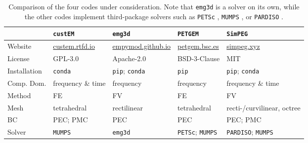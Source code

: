 \documentclass[onecolumn,extra,camera]{gji}
\newcommand{\emg}[2]{\texttt{emg#1#2}\xspace}
\newcommand{\simpeg}{\texttt{SimPEG}\xspace}
\newcommand{\custem}{\texttt{custEM}\xspace}
\newcommand{\petgem}{\texttt{PETGEM}\xspace}
\begin{document}
%
\begin{table}
\begin{minipage}{.9\linewidth}
  \centering
  \caption{Comparison of the four codes under consideration. Note that \emg3d is a solver on its own, while the other codes implement third-package solvers such as \texttt{PETSc} \citep{Preprint.Abhyankar}, \texttt{MUMPS} \citep{SIAM.01.Amestoy}, or \texttt{PARDISO} \citep{FGCS.04.Schenk}.}
\label{tbl:codecomparison}
  \begin{tabularx}{\linewidth}{lXXXX}
  \toprule
  & \custem & \emg3d & \petgem & \simpeg  \\
  \midrule
  Website & \href{https://custem.rtfd.io}{custem.rtfd.io}
          & \href{https://empymod.github.io}{empymod.github.io}
          & \href{http://petgem.bsc.es}{petgem.bsc.es}
          & \href{https://docs.simpeg.xyz}{simpeg.xyz} \\
  License & GPL-3.0 & Apache-2.0 & BSD-3-Clause & MIT \\
  Installation & \texttt{conda}
               & \texttt{pip}; \texttt{conda}
               & \texttt{pip}
               & \texttt{pip}; \texttt{conda} \\
  Comp. Dom. & frequency \& time & frequency & frequency & frequency \& time \\
  Method & FE & FV & FE & FV \\
  Mesh & tetrahedral & rectilinear & tetrahedral & recti-/curvilinear, octree \\
  BC & PEC; PMC & PEC & PEC & PEC; PMC \\
  Solver & \texttt{MUMPS} & \emg3d & \texttt{PETSc}; \texttt{MUMPS} &
           \texttt{PARDISO}; \texttt{MUMPS} \\
  \bottomrule
\end{tabularx}
\end{minipage}
\end{table}
%
\end{document}
